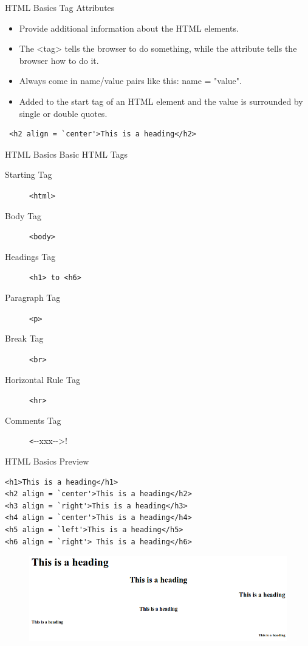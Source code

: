 \documentclass[14pt]{beamer}
\begin{document}
\begin{frame}[fragile]{HTML Basics}
 Tag Attributes
 \small
 \begin{itemize}
  \item Provide additional information about the HTML elements.
  \item The <tag> tells the browser to do something, while the attribute tells the browser how to do it.
  \item Always come in name/value pairs like this: name = "value". 
  \item Added to the start tag of an HTML element and the value is surrounded by single or double quotes.
 \end{itemize}
\begin{lstlisting}
 <h2 align = `center'>This is a heading</h2>
\end{lstlisting}
\end{frame}

\begin{frame}{HTML Basics}
 Basic HTML Tags
 \begin{center}
  \begin{description}
  \item [Starting Tag] \lstinline!<html>!
  \item [Body Tag] \lstinline!<body>!
  \item [Headings Tag] \lstinline!<h1> to <h6>!
  \item [Paragraph Tag] \lstinline!<p>!
  \item [Break Tag] \lstinline!<br>!
  \item [Horizontal Rule Tag] \lstinline!<hr>!
  \item [Comments Tag] \lstinline!<!\mbox{-}\mbox{-}xxx\mbox{-}\mbox{-}>!
 \end{description}
 \end{center}
\end{frame}

\begin{frame}[fragile]{HTML Basics}
 Preview

\begin{lstlisting}
<h1>This is a heading</h1>
<h2 align = `center'>This is a heading</h2>
<h3 align = `right'>This is a heading</h3>
<h4 align = `center'>This is a heading</h4>
<h5 align = `left'>This is a heading</h5>
<h6 align = `right'> This is a heading</h6>
\end{lstlisting}

\begin{figure}[H]
 \includegraphics[scale=.4]{preview.png}
\end{figure}
\end{frame}
\end{document}
